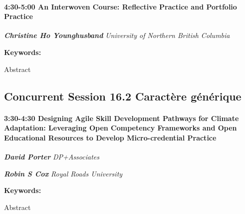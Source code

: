 \documentclass[
]{book}
\begin{document}
\begin{session}
\hypertarget{an-interwoven-course-reflective-practice-and-portfolio-practice}{%
\paragraph*{\texorpdfstring{4:30-5:00 \textbar{} \textbf{An Interwoven
Course: Reflective Practice and Portfolio} \textbar{}
Practice}{4:30-5:00 \textbar{} An Interwoven Course: Reflective Practice and Portfolio \textbar{} Practice}}\label{an-interwoven-course-reflective-practice-and-portfolio-practice}}

\textbf{\emph{Christine Ho Younghusband}} \textbar{} \emph{University of
Northern British Columbia}

\textbf{Keywords:}

Abstract
\end{session}

\hypertarget{concurrent-session-16.2-wildcard}{%
\subsection*{Concurrent Session 16.2 \textbar{} Caractère générique}\label{concurrent-session-16.2-wildcard}}

\begin{session}
\hypertarget{designing-agile-skill-development-pathways-for-climate-adaptation-leveraging-open-competency-frameworks-and-open-educational-resources-to-develop-micro-credential-practice}{%
\paragraph*{\texorpdfstring{3:30-4:30 \textbar{} \textbf{Designing Agile
Skill Development Pathways for Climate Adaptation: Leveraging Open
Competency Frameworks and Open Educational Resources to Develop
Micro-credential} \textbar{}
Practice}{3:30-4:30 \textbar{} Designing Agile Skill Development Pathways for Climate Adaptation: Leveraging Open Competency Frameworks and Open Educational Resources to Develop Micro-credential \textbar{} Practice}}\label{designing-agile-skill-development-pathways-for-climate-adaptation-leveraging-open-competency-frameworks-and-open-educational-resources-to-develop-micro-credential-practice}}

\textbf{\emph{David Porter}} \textbar{} \emph{DP+Associates}

\textbf{\emph{Robin S Cox}} \textbar{} \emph{Royal Roads University}

\textbf{Keywords:}

Abstract
\end{session}
\end{document}
